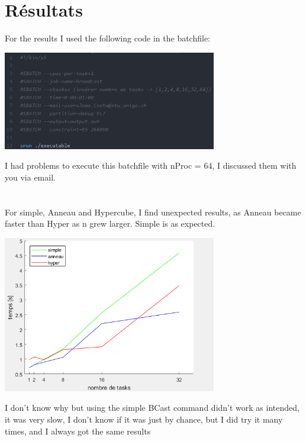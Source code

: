 \documentclass[a4paper]{article}
\begin{document}
\section*{Résultats}
For the results I used the following code in the batchfile:
\begin{center}
\includegraphics[width=0.7\textwidth]{images/batch.PNG}\\[1cm] 
\end{center}
I had problems to execute this batchfile with nProc = 64, I discussed them with you via email.\\\\\\

For simple, Anneau and Hypercube, I find unexpected results, as Anneau became faster than Hyper as n grew larger. Simple is as expected.

\begin{center}
\includegraphics[width=0.7\textwidth]{images/graph.PNG}\\[1cm] 
\end{center}


I don't know why but using the simple BCast command didn't work as intended, it was very slow, I don't know if it was just by chance, but I did try it many times, and I always got the same results
\end{document}
